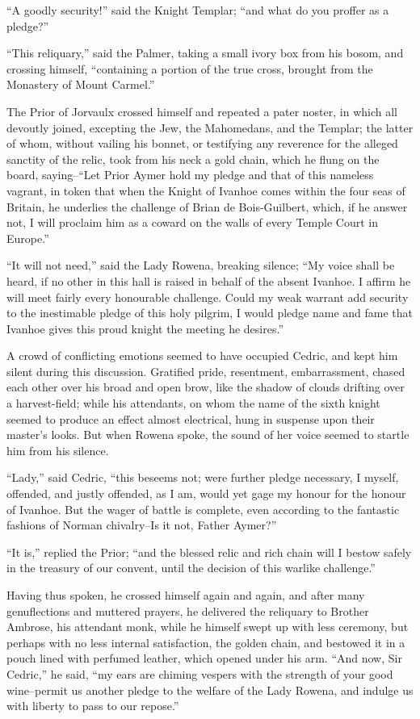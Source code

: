 ``A goodly security!'' said the Knight Templar; ``and what do you
proffer as a pledge?''

``This reliquary,'' said the Palmer, taking a small ivory box from his
bosom, and crossing himself, ``containing a portion of the true cross,
brought from the Monastery of Mount Carmel.''

The Prior of Jorvaulx crossed himself and repeated a pater noster, in
which all devoutly joined, excepting the Jew, the Mahomedans, and the
Templar; the latter of whom, without vailing his bonnet, or testifying
any reverence for the alleged sanctity of the relic, took from his neck
a gold chain, which he flung on the board, saying--``Let Prior Aymer
hold my pledge and that of this nameless vagrant, in token that when the
Knight of Ivanhoe comes within the four seas of Britain, he underlies
the challenge of Brian de Bois-Guilbert, which, if he answer not, I will
proclaim him as a coward on the walls of every Temple Court in Europe.''

``It will not need,'' said the Lady Rowena, breaking silence; ``My voice
shall be heard, if no other in this hall is raised in behalf of the
absent Ivanhoe. I affirm he will meet fairly every honourable challenge.
Could my weak warrant add security to the inestimable pledge of this
holy pilgrim, I would pledge name and fame that Ivanhoe gives this proud
knight the meeting he desires.''

A crowd of conflicting emotions seemed to have occupied Cedric, and kept
him silent during this discussion. Gratified pride, resentment,
embarrassment, chased each other over his broad and open brow, like the
shadow of clouds drifting over a harvest-field; while his attendants, on
whom the name of the sixth knight seemed to produce an effect almost
electrical, hung in suspense upon their master's looks. But when Rowena
spoke, the sound of her voice seemed to startle him from his silence.

``Lady,'' said Cedric, ``this beseems not; were further pledge
necessary, I myself, offended, and justly offended, as I am, would yet
gage my honour for the honour of Ivanhoe. But the wager of battle is
complete, even according to the fantastic fashions of Norman
chivalry--Is it not, Father Aymer?''

``It is,'' replied the Prior; ``and the blessed relic and rich chain
will I bestow safely in the treasury of our convent, until the decision
of this warlike challenge.''

Having thus spoken, he crossed himself again and again, and after many
genuflections and muttered prayers, he delivered the reliquary to
Brother Ambrose, his attendant monk, while he himself swept up with less
ceremony, but perhaps with no less internal satisfaction, the golden
chain, and bestowed it in a pouch lined with perfumed leather, which
opened under his arm. ``And now, Sir Cedric,'' he said, ``my ears are
chiming vespers with the strength of your good wine--permit us another
pledge to the welfare of the Lady Rowena, and indulge us with liberty to
pass to our repose.''

